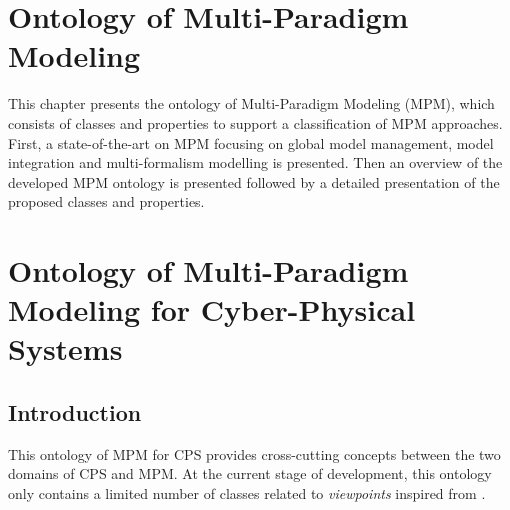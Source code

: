 \documentclass[final]{include/MPM4CPS/MPM4CPS-Report} %
\newcommand{\LEAD}[1]{{\marginpar{\textcolor{blue}{LEAD: #1}}}}
\newcommand{\ALSO}[1]{{\marginpar{\textcolor{lightgray}{ALSO: #1}}}}
\newcommand{\STATUS}[1]{{\marginpar{\textcolor{red}{STATUS: #1}}}}
\newcommand{\DONE}[2][N.N.]{{\todo[color=lightgray]{\tiny DONE[#1]: #2}}}
\begin{document}


\chapter{Ontology of Multi-Paradigm Modeling}
\label{ch:mpm}

\LEAD{Moussa}\ALSO{Dominique \& Holger}
This chapter presents the ontology of Multi-Paradigm Modeling (MPM), which consists of classes and properties to support a classification of MPM approaches. First, a state-of-the-art on MPM focusing on global model management, model integration and multi-formalism modelling is presented. Then an overview of the developed MPM ontology is presented followed by a detailed presentation of the proposed classes and properties.




\label{sec:Ontology-MML}

\chapter{Ontology of Multi-Paradigm Modeling for Cyber-Physical Systems}
\label{ch:mpm4cps}
\STATUS{For the deliverables, this needs to be completed with the basic examples of Bronan et al. dusplayed in the ontology and references to the paper. For the book, we should also capture the viewpoints for the Ensemble-Based and HPI CPS lab examples with the ontology, which may trigger some changes in the ontology as new concepts may be required.}

\section{Introduction}

This ontology of MPM for CPS provides cross-cutting concepts between the two domains of CPS and MPM. At the current stage of development, this ontology only contains a limited number of classes related to \emph{viewpoints} inspired from \cite{Broman2012}. 


\end{document}
